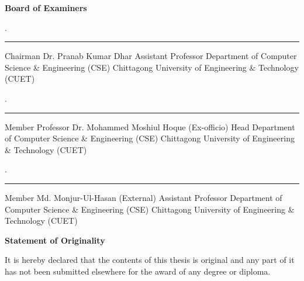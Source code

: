 \vspace{20mm}
\begin{center}
{\Large \textbf{Board of Examiners}}
\end{center}

\vspace{10mm} 
. \rule{4cm}{0.4pt} \hfill Chairman  \newline
Dr. Pranab Kumar Dhar \newline
Assistant Professor \newline
Department of Computer Science \& Engineering (CSE) \newline
Chittagong University of Engineering \& Technology (CUET) \newline


\vspace{10mm} 
. \rule{7cm}{0.4pt} \hfill Member  \newline Professor Dr. Mohammed Moshiul Hoque \hfill (Ex-officio) \newline
Head \newline
Department of Computer Science \& Engineering (CSE) \newline
Chittagong University of Engineering \& Technology (CUET) \newline

\vspace{10mm} 
. \rule{3.5cm}{0.4pt} \hfill Member  \newline
Md. Monjur-Ul-Hasan \hfill (External) \newline
Assistant Professor \newline
Department of Computer Science \& Engineering (CSE) \newline
Chittagong University of Engineering \& Technology (CUET) \newline

\newpage



\thispagestyle{empty}

\begin{center}
{\Large \textbf{Statement of Originality}}
\end{center}

\vspace{10mm}
It is hereby declared that the contents of this thesis is original and any part of it has not been submitted elsewhere for the award of any degree or diploma.

\vspace{50mm}

